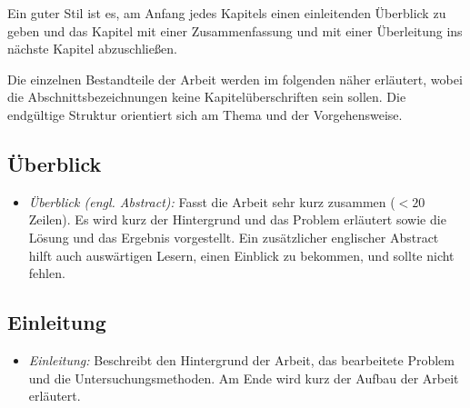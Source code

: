 \documentclass[conference,final,a4paper]{IEEEtran}
\begin{document}
Ein guter Stil ist es, am Anfang jedes Kapitels einen einleitenden Überblick zu geben und das Kapitel mit einer Zusammenfassung und mit einer Überleitung ins nächste Kapitel abzuschließen. 

Die einzelnen Bestandteile der Arbeit werden im folgenden näher erläutert, wobei die Abschnittsbezeichnungen keine Kapitelüberschriften sein sollen. Die endgültige Struktur orientiert sich am Thema und der Vorgehensweise.

\subsection{Überblick}
\begin{itemize}
\item \emph{Überblick (engl. Abstract):} Fasst die Arbeit sehr kurz zusammen ($<20$ Zeilen). Es wird kurz der Hintergrund und das Problem erläutert sowie die Lösung und das Ergebnis vorgestellt. Ein zusätzlicher englischer Abstract hilft auch auswärtigen Lesern, einen Einblick zu bekommen, und sollte nicht fehlen.
\end{itemize}
\subsection{Einleitung}
\begin{itemize}
\item \emph{Einleitung:} Beschreibt den Hintergrund der Arbeit, das bearbeitete Problem und die Untersuchungsmethoden. Am Ende wird kurz der Aufbau der Arbeit erläutert.
\end{itemize}
\end{document}
